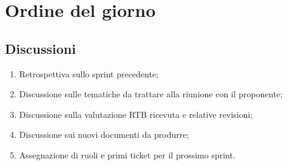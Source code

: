 \section{Ordine del giorno} \label{sec:agenda}
\subsection{Discussioni} \label{subsec:discussione}
\begin{enumerate}
    \item Retrospettiva sullo sprint precedente;
    \item Discussione sulle tematiche da trattare alla riunione con il proponente;
    \item Discussione sulla valutazione RTB ricevuta e relative revisioni;
    \item Discussione sui nuovi documenti da produrre;
    \item Assegnazione di ruoli e primi ticket per il prossimo sprint.
\end{enumerate}
